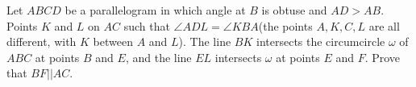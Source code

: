 Let $ABCD$ be a parallelogram in which angle at $B$ is obtuse and $AD>AB$. Points $K$ and $L$ on $AC$ such that $\angle ADL=\angle KBA$(the points $A, K, C, L$ are all different, with $K$ between $A$ and $L$). The line $BK$ intersects the circumcircle $\omega$ of $ABC$ at points $B$ and $E$,  and the line $EL$ intersects $\omega$ at points $E$ and $F$. Prove that $BF||AC$.